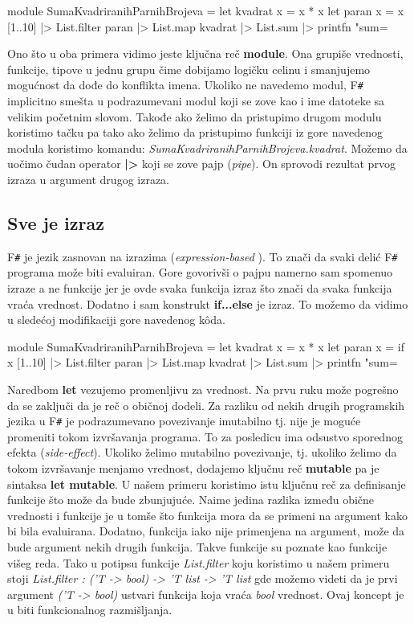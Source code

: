 \documentclass[a4paper]{article}
\begin{document}
\begin{fslisting}
module SumaKvadriranihParnihBrojeva =
    let kvadrat x = x * x
    let paran x = x %
    [1..10] |> List.filter paran |> List.map kvadrat |> List.sum |> printfn "sum=%
\end{fslisting}  

Ono što u oba primera vidimo jeste ključna reč \textbf{module}. Ona grupiše vrednosti, funkcije, tipove u jednu grupu čime dobijamo logičku celinu i smanjujemo mogućnost da dođe do konflikta imena. Ukoliko ne navedemo modul, F\texttt{\#} implicitno smešta u podrazumevani modul koji se zove kao i ime datoteke sa velikim početnim slovom. Takođe ako želimo da pristupimo drugom modulu koristimo tačku pa tako ako želimo da pristupimo funkciji iz gore navedenog modula koristimo komandu: \textit{SumaKvadriranihParnihBrojeva.kvadrat}. Možemo da uočimo čudan operator \textbf{|>}  koji se zove pajp (\textit{pipe}). On sprovodi rezultat prvog izraza u argument drugog izraza.

\subsection{Sve je izraz}
F\texttt{\#} je jezik zasnovan na izrazima ({\em expression-based} \cite{bookOfFs}). To znači da svaki delić F\texttt{\#} programa može biti evaluiran. Gore govorivši o pajpu namerno sam spomenuo izraze a ne funkcije jer je ovde svaka funkcija izraz što znači da svaka funkcija vraća vrednost. Dodatno i sam konstrukt \textbf{if...else} je izraz. To možemo da vidimo u sledećoj modifikaciji gore navedenog k\^{o}da.

 \begin{fslisting}
module SumaKvadriranihParnihBrojeva =
    let kvadrat x = x * x
    let paran x =  if x %
    [1..10] |> List.filter paran |> List.map kvadrat |> List.sum |> printfn "sum=%
\end{fslisting} 

Naredbom \textbf{let} vezujemo promenljivu za vrednost. Na prvu ruku može pogrešno da se zaključi da je reč o običnoj dodeli. Za razliku od nekih drugih programskih jezika u F\texttt{\#} je podrazumevano povezivanje imutabilno tj. nije je moguće promeniti tokom izvršavanja programa. To za posledicu ima odsustvo sporednog efekta (\textit{side-effect}). Ukoliko želimo mutabilno povezivanje, tj. ukoliko želimo da tokom izvršavanje menjamo vrednost, dodajemo ključnu reč \textbf{mutable} pa je sintaksa \textbf{let mutable}. U našem primeru koristimo istu ključnu reč za definisanje funkcije što može da bude zbunjujuće. Naime jedina razlika između obične vrednosti i funkcije je u tomše što funkcija mora da se primeni na argument kako bi bila evaluirana. Dodatno, funkcija iako nije primenjena na argument, može da bude argument nekih drugih funkcija. Takve funkcije su poznate kao funkcije višeg reda. Tako u potipsu funkcije \textit{List.filter} koju koristimo u našem primeru stoji \textit{List.filter : ('T -> bool) -> 'T list -> 'T list} gde možemo videti da je prvi argument \textit{('T -> bool)} ustvari funkcija koja vraća \textit{bool} vrednost. Ovaj koncept je u biti funkcionalnog razmišljanja.
\end{document}
